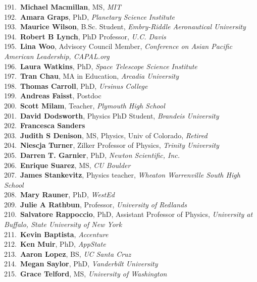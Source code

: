 191.~{\bf Michael Macmillan}, MS, {\sl MIT} \\
192.~{\bf Amara Graps}, PhD, {\sl Planetary Science Institute} \\
193.~{\bf Maurice Wilson}, B.Sc. Student, {\sl Embry-Riddle Aeronautical University} \\
194.~{\bf Robert B Lynch}, PhD Professor, {\sl U.C. Davis} \\
195.~{\bf Lina Woo}, Advisory Council Member, {\sl Conference on Asian Pacific American Leadership,  CAPAL.org} \\
196.~{\bf Laura Watkins}, PhD, {\sl Space Telescope Science Institute} \\
197.~{\bf Tran Chau}, MA in Education, {\sl Arcadia University} \\
198.~{\bf Thomas Carroll}, PhD, {\sl Ursinus College} \\
199.~{\bf Andreas Faisst}, Postdoc \\
200.~{\bf Scott Milam}, Teacher, {\sl Plymouth High School} \\
201.~{\bf David Dodsworth}, Physics PhD Student, {\sl Brandeis University} \\
202.~{\bf Francesca Sanders} \\
203.~{\bf Judith S Denison}, MS, Physics, Univ of Colorado, {\sl Retired} \\
204.~{\bf Niescja Turner}, Zilker Professor of Physics, {\sl Trinity University} \\
205.~{\bf Darren T. Garnier}, PhD, {\sl Newton Scientific, Inc.} \\
206.~{\bf Enrique Suarez}, MS, {\sl CU Boulder} \\
207.~{\bf James Stankevitz}, Physics teacher, {\sl Wheaton Warrenville South High School} \\
208.~{\bf Mary Rauner}, PhD, {\sl WestEd} \\
209.~{\bf Julie A Rathbun}, Professor, {\sl University of Redlands } \\
210.~{\bf Salvatore Rappoccio}, PhD, Assistant Professor of Physics, {\sl University at Buffalo, State University of New York} \\
211.~{\bf Kevin Baptista}, {\sl Accenture} \\
212.~{\bf Ken Muir}, PhD, {\sl AppState} \\
213.~{\bf Aaron Lopez}, BS, {\sl UC Santa Cruz} \\
214.~{\bf Megan Saylor}, PhD, {\sl Vanderbilt University} \\
215.~{\bf Grace Telford}, MS, {\sl University of Washington} \\
